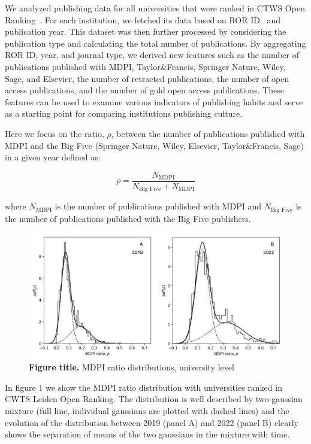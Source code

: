 \documentclass[amsfonts, amssymb, prl, superscriptaddress, notitlepage, twocolumn, nofootinbib]{revtex4-2}
\begin{document}
We analyzed publishing data for all universities that were ranked in CTWS Open Ranking~\cite{cwts2024leiden}. For each institution, we fetched its data based on ROR ID~\cite{ROR} and publication year. This dataset was then further processed by considering the publication type and calculating the total number of publications. By aggregating ROR ID, year, and journal type, we derived new features such as the number of publications published with MDPI, Taylor\&Francis, Springer Nature, Wiley, Sage, and Elsevier, the number of retracted publications, the number of open access publications, and the number of gold open access publications. These features can be used to examine various indicators of publishing habits and serve as a starting point for comparing institutions publishing culture. 

Here we focus on the ratio, $\rho$, between the number of publications published with MDPI and the Big Five (Springer Nature, Wiley, Elsevier, Taylor\&Francis, Sage) in a given year defined as: 

\begin{equation}
\rho = \frac{N_{\text{MDPI}}}{N_{\text{Big Five}}+N_{\text{MDPI}}}
\end{equation}

where $N_{\text{MDPI}}$ is the number of publications published with MDPI and $N_{\text{Big Five}}$ is the number of publications published with the Big Five publishers.

\begin{figure}
\centering
\includegraphics[width=1.0\linewidth]{Fig01.png}
\caption{\label{fig:fig1} {\bf Figure title.} MDPI ratio distributions, university level  
}
\end{figure}

In figure 1 we show the MDPI ratio distribution with universities ranked in CWTS Leiden Open Ranking. The distribution is well described by two-gaussian mixture (full line, individual gaussians  are plotted with dashed lines) and the evolution of the distribution between 2019 (panel A) and 2022 (panel B) clearly shows the separation of means of the two gaussians in the mixture with time.  
\end{document}
